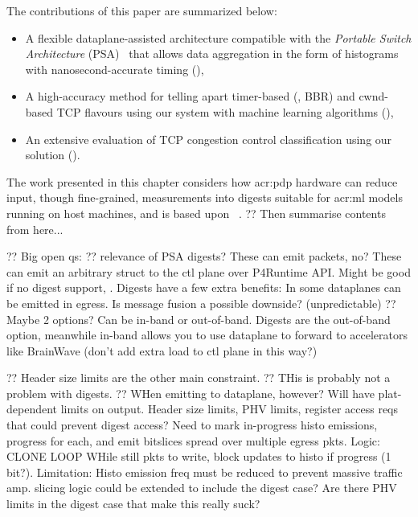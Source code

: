 The contributions of this paper are summarized below:
\begin{itemize}
	\item A flexible dataplane-assisted architecture compatible with the \emph{Portable Switch Architecture} (PSA)~\parencite{p4-psa} that allows data aggregation in the form of histograms with nanosecond-accurate timing (),
	\item A high-accuracy method for telling apart timer-based (\eg, BBR) and cwnd-based TCP flavours using our system with machine learning algorithms (),
	\item An extensive evaluation of TCP congestion control classification using our solution ().
\end{itemize}

The work presented in this chapter considers how \gls{acr:pdp} hardware can reduce input, though fine-grained, measurements into digests suitable for \gls{acr:ml} models running on host machines, and is based upon ~\parencite{DBLP:conf/globecom/SimpsonCP20}.
?? Then summarise contents from here...

?? Big open qs:
?? relevance of PSA digests? These can emit packets, no? These can emit an arbitrary struct to the ctl plane over P4Runtime API. Might be good if no digest support, . Digests have a few extra benefits: In some dataplanes can be emitted in egress. Is message fusion a possible downside? (unpredictable)
?? Maybe 2 options? Can be in-band or out-of-band. Digests are the out-of-band option, meanwhile in-band allows you to use dataplane to forward to accelerators like BrainWave (don't add extra load to ctl plane in this way?)

?? Header size limits are the other main constraint.
?? THis is probably not a problem with digests.
?? WHen emitting to dataplane, however? Will have plat-dependent limits on output. Header size limits, PHV limits, register access reqs that could prevent digest access? Need to mark in-progress histo emissions, progress for each, and emit bitslices spread over multiple egress pkts. Logic: CLONE LOOP WHile still pkts to write, block updates to histo if progress (1 bit?). Limitation: Histo emission freq must be reduced to prevent massive traffic amp. slicing logic could be extended to include the digest case? Are there PHV limits in the digest case that make this really suck?

%

